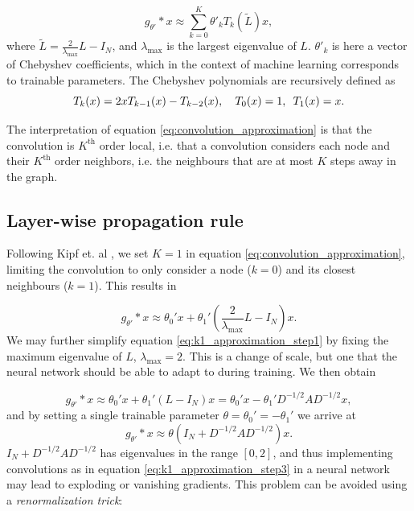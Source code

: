 \begin{equation}
    g_{\theta'} * x \approx \sum_{k=0}^K \theta'_k T_k(\tilde{L})x,
    \label{eq:convolution_approximation}
\end{equation}
where $\tilde{L} =  \frac{2}{\lambda_{\text{max}}}L - I_N$, and $\lambda_{\text{max}}$ is the largest eigenvalue of $L$. $\theta'_k$ is here a vector of Chebyshev coefficients, which in the context of machine learning corresponds to trainable parameters. The Chebyshev polynomials are recursively defined as 
\begin{equation}
    T_k(x) = 2xT_{k-1}(x) - T_{k-2}(x), \hspace{10px} T_0(x) = 1, \hspace{5px} T_1(x) = x.
\end{equation}

The interpretation of equation \eqref{eq:convolution_approximation} is that the convolution is $K^{\text{th}}$ order local, i.e. that a convolution considers each node and their $K^{\text{th}}$ order neighbors, i.e. the neighbours that are at most $K$ steps away in the graph. 


\subsection{Layer-wise propagation rule}

Following Kipf et. al \cite{kipf_semi_supervised}, we set $K=1$ in equation \eqref{eq:convolution_approximation}, limiting the convolution to only consider a node ($k=0$) and its closest neighbours ($k=1$). This results in 

\begin{equation}
    g_{\theta'} * x \approx \theta_0' x + \theta_1' \left( \frac{2}{\lambda_{\text{max}}}L - I_N \right)x.
    \label{eq:k1_approximation_step1}
\end{equation}
We may further simplify equation \eqref{eq:k1_approximation_step1} by fixing the maximum eigenvalue of $L$, $\lambda_{\text{max}} = 2$. This is a change of scale, but one that the neural network should be able to adapt to during training. We then obtain

\begin{equation}
    g_{\theta'} * x \approx \theta_0' x + \theta_1' \left(L - I_N \right)x = \theta_0' x - \theta_1' D^{-1/2}AD^{-1/2}x ,
    \label{eq:k1_approximation_step2}
\end{equation}
and by setting a single trainable parameter $\theta = \theta_0' = -\theta_1'$ we arrive at 
\begin{equation}
    g_{\theta'} * x \approx \theta \left(I_N + D^{-1/2}AD^{-1/2} \right)x. 
    \label{eq:k1_approximation_step3}
\end{equation}
$I_N + D^{-1/2}AD^{-1/2}$ has eigenvalues in the range $[0, 2]$, and thus implementing convolutions as in equation \eqref{eq:k1_approximation_step3} in a neural network may lead to exploding or vanishing gradients. This problem can be avoided using a \textit{renormalization trick}:

